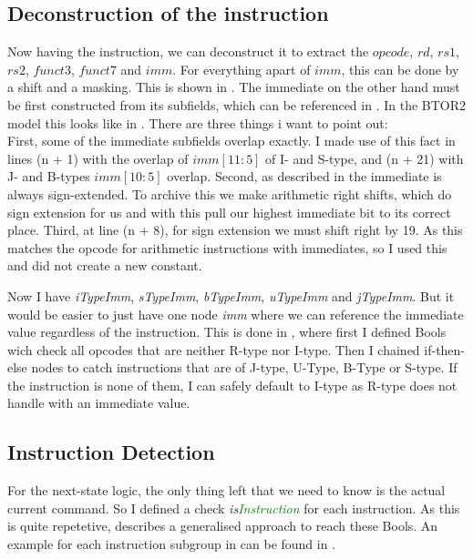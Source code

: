 \subsection{Deconstruction of the instruction}
Now having the instruction, we can deconstruct it to extract the $opcode$,
$rd$, $rs1$, $rs2$, $funct3$, $funct7$ and $imm$. For everything apart of
$imm$, this can be done by a shift and a masking. This is shown in
.
The immediate on the other hand must be first constructed from its subfields, which can be referenced in .
In the BTOR2 model this looks like in .
There are three things i want to point out:\\
First, some of the immediate subfields overlap exactly. I made use of this fact in lines (n + 1) with the overlap of $imm[11:5]$ of I- and S-type,  and (n + 21) with J- and B-types $imm[10:5]$ overlap.
Second, as described in  the immediate is always sign-extended. To archive this we make arithmetic right shifts, which do sign extension for us and with this pull our highest immediate bit to its correct place.
Third, at line (n + 8), for sign extension we must shift right by 19. As this matches the opcode for arithmetic instructions with immediates, so I used this and did not create a new constant.

Now I have \textsl{iTypeImm}, \textsl{sTypeImm}, \textsl{bTypeImm}, \textsl{uTypeImm} and \textsl{jTypeImm}.
But it would be easier to just have one node \textsl{imm} where we can reference the immediate value regardless of the instruction.
This is done in , where first I defined Bools wich check all opcodes that are neither R-type nor I-type.
Then I chained if-then-else nodes to catch instructions that are of J-type, U-Type, B-Type or S-type.
If the instruction is none of them, I can safely default to I-type as R-type does not handle with an immediate value.






\subsection{Instruction Detection}

For the next-state logic, the only thing left that we need to know is the actual current command.
So I defined a check \textsl{is\textcolor{Green}{Instruction}} for each instruction. As this is quite repetetive, 
describes a generalised approach to reach these Bools. An example for each instruction subgroup in  can be found in .

